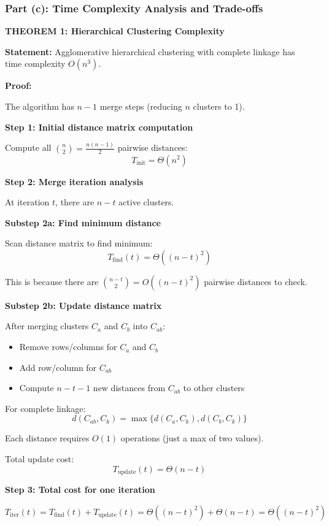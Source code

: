 \documentclass[12pt]{article}
\begin{document}
\subsubsection{Part (c): Time Complexity Analysis and Trade-offs}

\begin{solution}

\textbf{THEOREM 1: Hierarchical Clustering Complexity}

\textbf{Statement:} Agglomerative hierarchical clustering with complete linkage has time complexity $O(n^3)$.

\textbf{Proof:}

The algorithm has $n-1$ merge steps (reducing $n$ clusters to 1).

\textbf{Step 1: Initial distance matrix computation}

Compute all $\binom{n}{2} = \frac{n(n-1)}{2}$ pairwise distances:
\[
T_{\text{init}} = \Theta(n^2)
\]

\textbf{Step 2: Merge iteration analysis}

At iteration $t$, there are $n - t$ active clusters.

\textbf{Substep 2a: Find minimum distance}

Scan distance matrix to find minimum:
\[
T_{\text{find}}(t) = \Theta((n-t)^2)
\]

This is because there are $\binom{n-t}{2} = O((n-t)^2)$ pairwise distances to check.

\textbf{Substep 2b: Update distance matrix}

After merging clusters $C_a$ and $C_b$ into $C_{ab}$:
\begin{itemize}
\item Remove rows/columns for $C_a$ and $C_b$
\item Add row/column for $C_{ab}$
\item Compute $n - t - 1$ new distances from $C_{ab}$ to other clusters
\end{itemize}

For complete linkage:
\[
d(C_{ab}, C_k) = \max\{d(C_a, C_k), d(C_b, C_k)\}
\]

Each distance requires $O(1)$ operations (just a max of two values).

Total update cost:
\[
T_{\text{update}}(t) = \Theta(n - t)
\]

\textbf{Step 3: Total cost for one iteration}

\[
T_{\text{iter}}(t) = T_{\text{find}}(t) + T_{\text{update}}(t) = \Theta((n-t)^2) + \Theta(n-t) = \Theta((n-t)^2)
\]


\end{solution}
\end{document}
